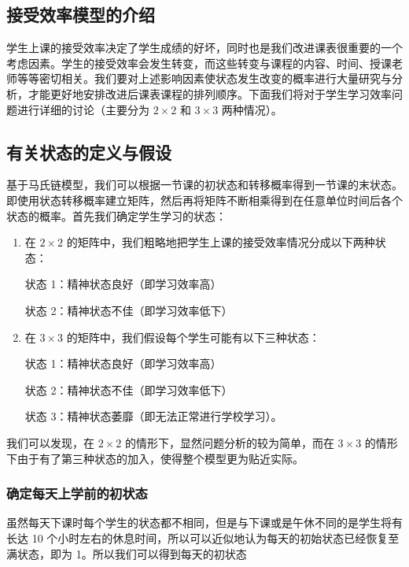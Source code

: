 \documentclass[a4paper]{article}
\begin{document}
 \subsection{接受效率模型的介绍}

  学生上课的接受效率决定了学生成绩的好坏，同时也是我们改进课表很重要的一个考虑因素。学生的接受效率会发生转变，而这些转变与课程的内容、时间、授课老师等等密切相关。我们要对上述影响因素使状态发生改变的概率进行大量研究与分析，才能更好地安排改进后课表课程的排列顺序。下面我们将对于学生学习效率问题进行详细的讨论（主要分为 $2\times2$ 和 $3\times3$ 两种情况）。

 \subsection{有关状态的定义与假设}

  基于马氏链模型，我们可以根据一节课的初状态和转移概率得到一节课的末状态。即使用状态转移概率建立矩阵，然后再将矩阵不断相乘得到在任意单位时间后各个状态的概率。首先我们确定学生学习的状态：

  \begin{enumerate}

  \item 在 $2\times2$ 的矩阵中，我们粗略地把学生上课的接受效率情况分成以下两种状态：

  状态 1：精神状态良好（即学习效率高）

  状态 2：精神状态不佳（即学习效率低下）

  \item 在 $3\times3$ 的矩阵中，我们假设每个学生可能有以下三种状态：

  状态 1：精神状态良好（即学习效率高）

  状态 2：精神状态不佳（即学习效率低下）

  状态 3：精神状态萎靡（即无法正常进行学校学习）。

  \end{enumerate}

  我们可以发现，在 $2\times2$ 的情形下，显然问题分析的较为简单，而在 $3\times3$ 的情形下由于有了第三种状态的加入，使得整个模型更为贴近实际。

  \subsubsection{确定每天上学前的初状态}

   虽然每天下课时每个学生的状态都不相同，但是与下课或是午休不同的是学生将有长达 10 个小时左右的休息时间，所以可以近似地认为每天的初始状态已经恢复至满状态，即为 1。所以我们可以得到每天的初状态
\end{document}
